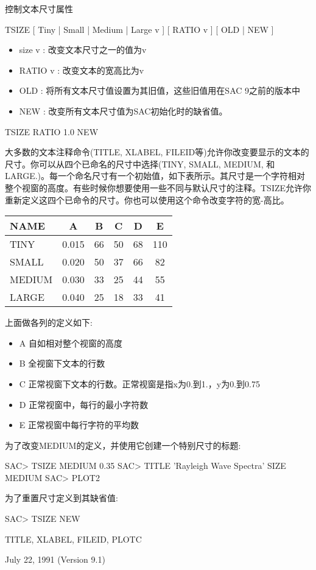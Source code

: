 \label{cmd:tsize}

控制文本尺寸属性

TSIZE [ Tiny | Small | Medium | Large v ] [ RATIO v ] [ OLD | NEW ]

\begin{itemize}
\item size v : 改变文本尺寸之一的值为v 
\item RATIO v : 改变文本的宽高比为v 
\item OLD : 将所有文本尺寸值设置为其旧值，这些旧值用在SAC 9之前的版本中 
\item NEW : 改变所有文本尺寸值为SAC初始化时的缺省值。
\end{itemize}

TSIZE RATIO 1.0 NEW

大多数的文本注释命令(TITLE, XLABEL, FILEID等)允许你改变要显示的文本的尺寸。你可以从四个已命名的尺寸中选择(TINY, SMALL, MEDIUM, 和LARGE.)。每一个命名尺寸有一个初始值，如下表所示。其尺寸是一个字符相对整个视窗的高度。有些时候你想要使用一些不同与默认尺寸的注释。TSIZE允许你重新定义这四个已命令的尺寸。你也可以使用这个命令改变字符的宽-高比。
\begin{center}
\begin{tabular}{lccccc}
\toprule
NAME	&	A	&	B	&	C	&	D	&	E	\\
\midrule
TINY 	& 0.015 &   66 	&  50  	&	68  &	110	\\
SMALL	& 0.020 &	50  &  37  	&	66  &	82	\\
MEDIUM  & 0.030 &	33  &  25  	&	44  &	55	\\
LARGE	& 0.040 &	25  &  18  	&	33  &	41	\\
\bottomrule
\end{tabular}
\end{center}

上面做各列的定义如下:
\begin{itemize}
\item A 自如相对整个视窗的高度
\item B 全视窗下文本的行数
\item C 正常视窗下文本的行数。正常视窗是指x为0.到1.，y为0.到0.75
\item D 正常视窗中，每行的最小字符数
\item E 正常视窗中每行字符的平均数
\end{itemize}

为了改变MEDIUM的定义，并使用它创建一个特别尺寸的标题:
\begin{SACCode}
SAC> TSIZE MEDIUM 0.35
SAC> TITLE 'Rayleigh Wave Spectra' SIZE MEDIUM
SAC> PLOT2
\end{SACCode}

为了重置尺寸定义到其缺省值:
\begin{SACCode}
SAC> TSIZE NEW
\end{SACCode}

TITLE, XLABEL, FILEID, PLOTC

July 22, 1991 (Version 9.1)

